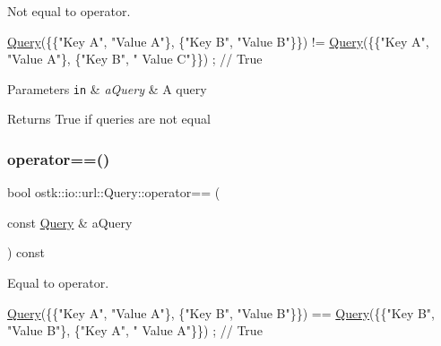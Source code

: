 Not equal to operator. 


\begin{DoxyCode}
\hyperlink{classostk_1_1io_1_1url_1_1_query_a10299b6b445c39886d6b689c14364fe1}{Query}(\{\{\textcolor{stringliteral}{"Key A"}, \textcolor{stringliteral}{"Value A"}\}, \{\textcolor{stringliteral}{"Key B"}, \textcolor{stringliteral}{"Value B"}\}\}) != \hyperlink{classostk_1_1io_1_1url_1_1_query_a10299b6b445c39886d6b689c14364fe1}{Query}(\{\{\textcolor{stringliteral}{"Key A"}, \textcolor{stringliteral}{"Value A"}\}, \{\textcolor{stringliteral}{"Key B"}, \textcolor{stringliteral}{"
      Value C"}\}\}) ; \textcolor{comment}{// True}
\end{DoxyCode}



\begin{DoxyParams}[1]{Parameters}
\mbox{\tt in}  & {\em a\+Query} & A query \\
\hline
\end{DoxyParams}
\begin{DoxyReturn}{Returns}
True if queries are not equal 
\end{DoxyReturn}
\mbox{\label{classostk_1_1io_1_1url_1_1_query_a2e971d5f134f3229f136b62a5218a9cd}} 
\subsubsection{\texorpdfstring{operator==()}{operator==()}}
{\footnotesize\ttfamily bool ostk\+::io\+::url\+::\+Query\+::operator== (\begin{DoxyParamCaption}\item[{const \hyperlink{classostk_1_1io_1_1url_1_1_query}{Query} \&}]{a\+Query }\end{DoxyParamCaption}) const}



Equal to operator. 


\begin{DoxyCode}
\hyperlink{classostk_1_1io_1_1url_1_1_query_a10299b6b445c39886d6b689c14364fe1}{Query}(\{\{\textcolor{stringliteral}{"Key A"}, \textcolor{stringliteral}{"Value A"}\}, \{\textcolor{stringliteral}{"Key B"}, \textcolor{stringliteral}{"Value B"}\}\}) == \hyperlink{classostk_1_1io_1_1url_1_1_query_a10299b6b445c39886d6b689c14364fe1}{Query}(\{\{\textcolor{stringliteral}{"Key B"}, \textcolor{stringliteral}{"Value B"}\}, \{\textcolor{stringliteral}{"Key A"}, \textcolor{stringliteral}{"
      Value A"}\}\}) ; \textcolor{comment}{// True}
\end{DoxyCode}



